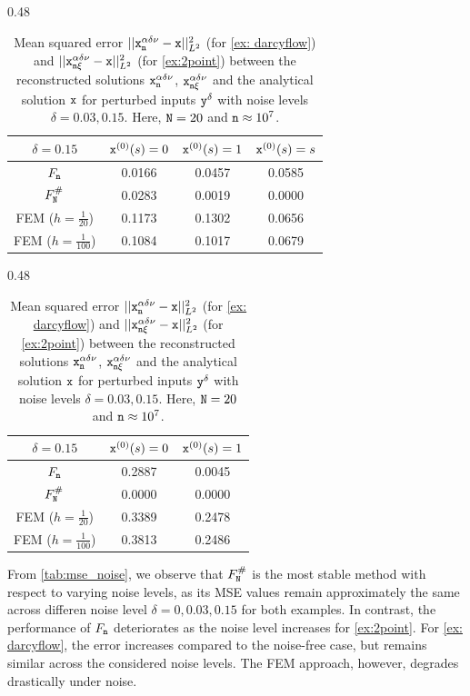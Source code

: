\documentclass[10pt]{article}
\numberwithin{equation}{section}
\theoremstyle{nonumberplain}
\newcommand{\y}{{\tt y}}
\newcommand{\n}{{\tt n}}
\newcommand{\x}{{\tt x}}
\newcommand{\no}{{\tt N}}
\begin{document}
\begin{table}[H]
     \hspace{0.55cm}\centering \footnotesize
    \begin{subtable}{0.48\textwidth}
        \centering
        \begin{tabular}{c|c|c|c}
            $\delta = 0.15$ & $\x^{(0)}(s) = 0$ & $\x^{(0)}(s) = 1$ & $\x^{(0)}(s) = s$\\ \hline
            $F_\n$ & 0.0166 & 0.0457 & 0.0585\\ \hline
            $F_\no^\#$ & 0.0283 & 0.0019 & 0.0000 \\ \hline
            FEM ($h = \frac{1}{20}$) & 0.1173 & 0.1302 & 0.0656 \\ \hline
            FEM ($h = \frac{1}{100}$) & 0.1084 & 0.1017  & 0.0679\\
        \end{tabular}
        \caption{\autoref{ex: darcyflow}, $\delta = 0.15$}
    \end{subtable}
    \hfill
    \begin{subtable}{0.48\textwidth}
        \centering
        \begin{tabular}{c|c|c}
            $\delta = 0.15$ & $\x^{(0)}(s) = 0$ & $\x^{(0)}(s) = 1$ \\ \hline
            $F_\n$ & 0.2887 & 0.0045\\ \hline
            $F_\no^\#$ & 0.0000 & 0.0000 \\ \hline
             FEM ($h = \frac{1}{20}$) & 0.3389 & 0.2478 \\ \hline
            FEM ($h = \frac{1}{100}$) & 0.3813 & 0.2486 \\
        \end{tabular}
        \caption{\autoref{ex:2point}, $\delta = 0.15$}
    \end{subtable}
    \caption{Mean squared error $||\x_\n^{\alpha\delta\nu} - \x||_{L^2}^2$ (for \autoref{ex: darcyflow}) and $||\x_{\n\xi}^{\alpha\delta\nu} - \x||_{L^2}^2$  (for \autoref{ex:2point}) between the reconstructed solutions $\x_\n^{\alpha\delta\nu}$, $\x_{\n\xi}^{\alpha\delta\nu}$ and the analytical solution $\x$ for perturbed inputs $\y^\delta$ with noise levels $\delta = 0.03, 0.15$. Here, $\no = 20$ and $\n \approx 10^7$.}
    \label{tab:mse_noise}
\end{table}

From \autoref{tab:mse_noise}, we observe that $F_\no^\#$ is the most stable method with respect to varying noise levels, as its MSE values remain approximately the same across differen noise level $\delta = 0, 0.03, 0.15$ for both examples. In contrast, the performance of $F_\n$ deteriorates as the noise level increases for \autoref{ex:2point}. For \autoref{ex: darcyflow}, the error increases compared to the noise-free case, but remains similar across the considered noise levels. The FEM approach, however, degrades drastically under noise. 
\end{document}
